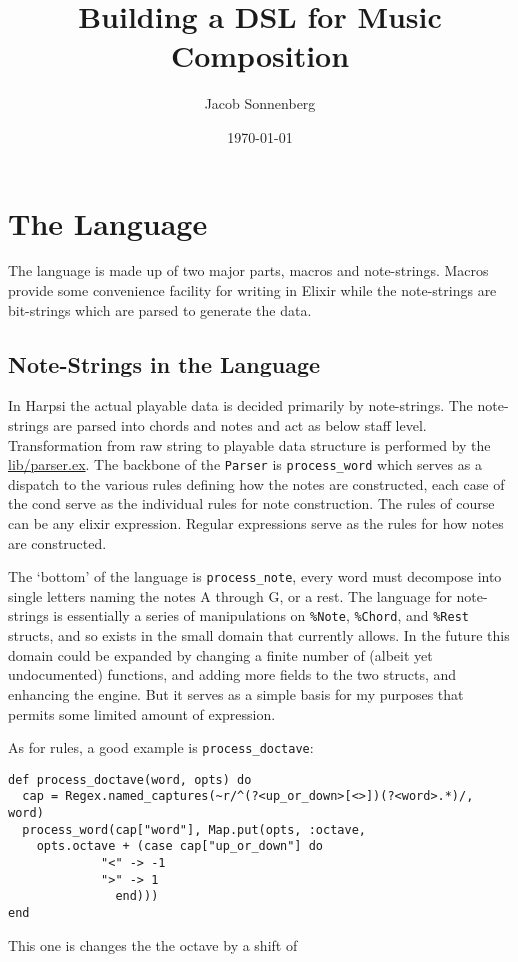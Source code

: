\documentclass[11pt]{article}
\author{Jacob Sonnenberg}
\date{\today}
\title{Building a DSL for Music Composition}
\begin{document}
\maketitle
\tableofcontents

\section{The Language}
\label{sec-1}
The language is made up of two major parts, macros and
note-strings. Macros provide some convenience facility for writing
in Elixir while the note-strings are bit-strings which are parsed to
generate the data.
\subsection{Note-Strings in the Language}
\label{sec-1-1}
In Harpsi the actual playable data is decided primarily by
note-strings. The note-strings are parsed into chords and notes and
act as below staff level. Transformation from raw string to
playable data structure is performed by the \url{lib/parser.ex}. The
backbone of the \verb~Parser~ is \verb~process_word~ which serves as a
dispatch to the various rules defining how the notes are
constructed, each case of the cond serve as the individual rules
for note construction. The rules of course can be any elixir
expression. Regular expressions serve as the rules for how notes
are constructed. 

The `bottom' of the language is \verb~process_note~, every word must
decompose into single letters naming the notes A through G, or a
rest. The language for note-strings is essentially a series of
manipulations on \verb~%Note~, \verb~%Chord~, and \verb~%Rest~ structs, and so exists in the
small domain that currently allows. In the future this domain could
be expanded by changing a finite number of (albeit yet
undocumented) functions, and adding more fields to the two structs,
and enhancing the engine. But it serves as a simple basis for my
purposes that permits some limited amount of expression.

As for rules, a good example is \verb~process_doctave~:
\begin{verbatim}
def process_doctave(word, opts) do
  cap = Regex.named_captures(~r/^(?<up_or_down>[<>])(?<word>.*)/, word)
  process_word(cap["word"], Map.put(opts, :octave,
	opts.octave + (case cap["up_or_down"] do
			 "<" -> -1
			 ">" -> 1
		       end)))
end
\end{verbatim}
This one is changes the the octave by a shift of 
\end{document}
